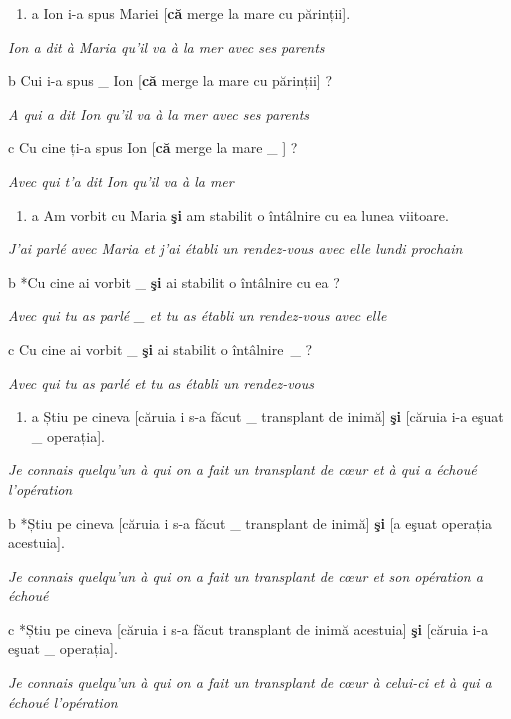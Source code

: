\begin{enumerate}
\item \label{bkm:Ref300245582}a  Ion i-a spus Mariei [\textbf{că} merge la mare cu părinții].


\end{enumerate}
{\itshape
Ion a dit à Maria qu'il va à la mer avec ses parents}

 b  Cui i-a spus \_ Ion [\textbf{că} merge la mare cu părinții] ?

  \textit{A qui a dit Ion qu'il va à la mer avec ses parents}

  c  Cu cine ți-a spus Ion [\textbf{că} merge la mare \_ ] ?

{\itshape
Avec qui t'a dit Ion qu'il va à la mer}


\begin{enumerate}
\item \label{bkm:Ref300245589}a  Am vorbit cu Maria \textbf{şi} am stabilit o întâlnire cu ea lunea viitoare.


\end{enumerate}
{\itshape
J'ai parlé avec Maria et j'ai établi un rendez-vous avec elle lundi prochain}

 b  *Cu cine ai vorbit \_ \textbf{şi} ai stabilit o întâlnire cu ea ?

  \textit{Avec qui tu as parlé \_ et tu as établi un rendez-vous avec elle}

  c  Cu cine ai vorbit \_ \textbf{şi} ai stabilit o întâlnire~\_ ?

{\itshape
Avec qui tu as parlé et tu as établi un rendez-vous}


\begin{enumerate}
\item \label{bkm:Ref272879507}a  Știu pe cineva [căruia i s-a făcut \_ transplant de inimă] \textbf{şi} [căruia i-a eşuat \_ operația].


\end{enumerate}
{\itshape
Je connais quelqu'un à qui on a fait un transplant de c{\oe}ur et à qui a échoué l'opération} 

  b  *Știu pe cineva [căruia i s-a făcut \_ transplant de inimă] \textbf{şi} [a eşuat operația acestuia].

{\itshape
Je connais quelqu'un à qui on a fait un transplant de c{\oe}ur et son opération a échoué} 

  c  *Știu pe cineva [căruia i s-a făcut transplant de inimă acestuia] \textbf{şi} [căruia i-a eşuat \_ operația].

{\itshape
Je connais quelqu'un à qui on a fait un transplant de c{\oe}ur à celui-ci et à qui a échoué l'opération} 

